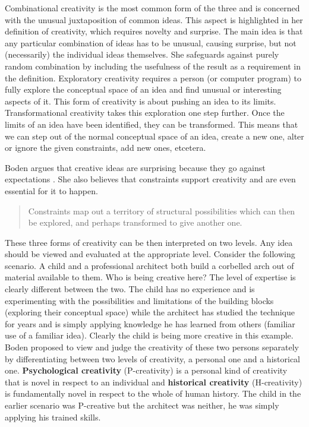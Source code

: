 Combinational creativity is the most common form of the three and is concerned with the unusual juxtaposition of common ideas. This aspect is highlighted in her definition of creativity, which requires novelty and surprise. The main idea is that any particular combination of ideas has to be unusual, causing surprise, but not (necessarily) the individual ideas themselves. She safeguards against purely random combination by including the usefulness of the result as a requirement in the definition. Exploratory creativity requires a person (or computer program) to fully explore the conceptual space of an idea and find unusual or interesting aspects of it. This form of creativity is about pushing an idea to its limits. Transformational creativity takes this exploration one step further. Once the limits of an idea have been identified, they can be transformed. This means that we can step out of the normal conceptual space of an idea, create a new one, alter or ignore the given constraints, add new ones, etcetera.

Boden argues that creative ideas are surprising because they go against expectations \citep{Boden2003}. She also believes that constraints support creativity and are even essential for it to happen.

\begin{quote}
  Constraints map out a territory of structural possibilities which can then be explored, and perhaps transformed to give another one. \citep{Boden2003}
\end{quote}

These three forms of creativity can be then interpreted on two levels. Any idea should be viewed and evaluated at the appropriate level. Consider the following scenario. A child and a professional architect both build a corbelled arch out of material available to them. Who is being creative here? The level of expertise is clearly different between the two. The child has no experience and is experimenting with the possibilities and limitations of the building blocks (exploring their conceptual space) while the architect has studied the technique for years and is simply applying knowledge he has learned from others (familiar use of a familiar idea). Clearly the child is being more creative in this example. Boden proposed to view and judge the creativity of these two persons separately by differentiating between two levels of creativity, a personal one and a historical one. \textbf{Psychological creativity} (P-creativity) is a personal kind of creativity that is novel in respect to an individual and \textbf{historical creativity} (H-creativity) is fundamentally novel in respect to the whole of human history. The child in the earlier scenario was P-creative but the architect was neither, he was simply applying his trained skills.

